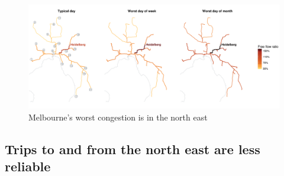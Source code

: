 \documentclass{grattan}
\begin{document}
%
%



\begin{figure}
\caption{Melbourne's worst congestion is in the north east}\label{fig:MEL-map-P50-80-90}
\includegraphics[width=\textwidth]{atlas/plot_three_MEL-1}
\addtolength{\tabcolsep}{-2pt}

\end{figure}

\subsection{Trips to and from the north east are less reliable}
\end{document}
